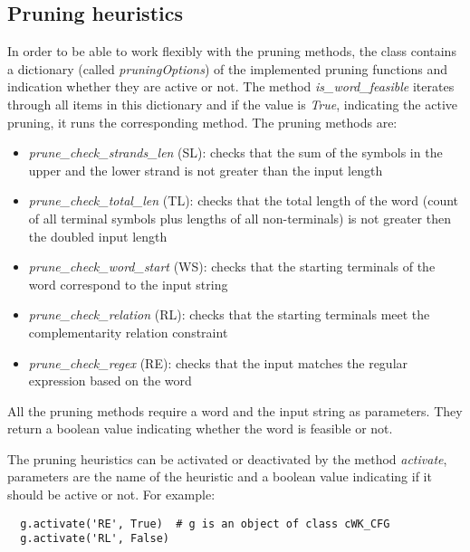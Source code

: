 \subsection{Pruning heuristics}
In order to be able to work flexibly with the pruning methods, the class contains a dictionary (called \textit{pruningOptions}) of the implemented pruning functions and indication whether they are active or not. The method \textit{is\_word\_feasible} iterates through all items in this dictionary and if the value is \textit{True}, indicating the active pruning, it runs the corresponding method.
The pruning methods are:
\begin{itemize}
  \item{\textit{prune\_check\_strands\_len} (SL): checks that the sum of the symbols in the upper and the lower strand is not greater than the input length}

  \item{\textit{prune\_check\_total\_len} (TL): checks that the total length of the word (count of all terminal symbols plus lengths of all non-terminals) is not greater then the doubled input length}

  \item{\textit{prune\_check\_word\_start} (WS): checks that the starting terminals of the word correspond to the input string}

  \item{\textit{prune\_check\_relation} (RL): checks that the starting terminals meet the complementarity relation constraint}

  \item{\textit{prune\_check\_regex} (RE): checks that the input matches the regular expression based on the word}
\end{itemize}

All the pruning methods require a word and the input string as parameters. They return a boolean value indicating whether the word is feasible or not.

The pruning heuristics can be activated or deactivated by the method \textit{activate}, parameters are the name of the heuristic and a boolean value indicating if it should be active or not. For example:

\begin{verbatim}
  g.activate('RE', True)  # g is an object of class cWK_CFG
  g.activate('RL', False)
\end{verbatim}


